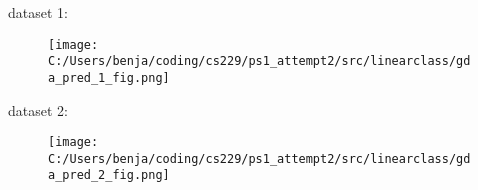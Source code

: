 %
%

\begin{answer}
	
	dataset 1:
	\begin{figure}[H]
		\texttt{[image: C:/Users/benja/coding/cs229/ps1\_attempt2/src/linearclass/gda\_pred\_1\_fig.png]}
	\end{figure}
	dataset 2:
	\begin{figure}[H]
		\texttt{[image: C:/Users/benja/coding/cs229/ps1\_attempt2/src/linearclass/gda\_pred\_2\_fig.png]}
	\end{figure}
\end{answer}

%

